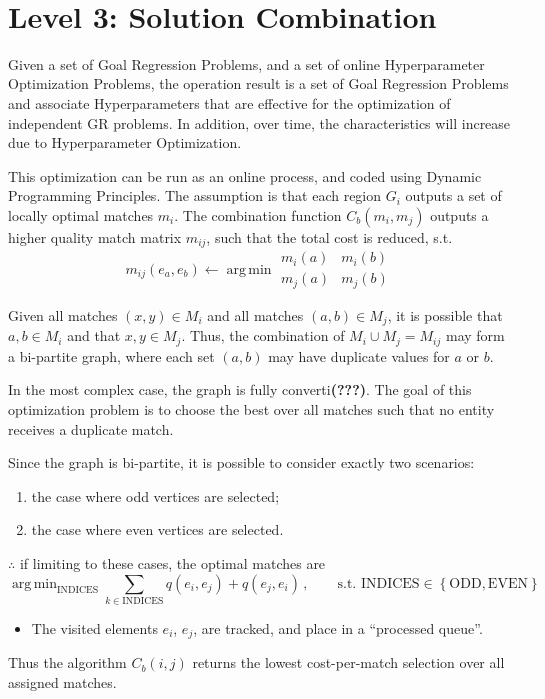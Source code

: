 \documentclass[compsoc,journal,letterpaper,10pt,draftclsnofoot,onecolumn]{IEEEtran}
\DeclareMathOperator*{\argmin}{arg\,min}
\begin{document}
{\ }\\



\section*{Level 3: Solution Combination}

Given a set of Goal Regression Problems, and a set of online Hyperparameter Optimization Problems, the operation result is a set of Goal Regression Problems and associate Hyperparameters that are effective for the optimization of independent GR problems. In addition, over time, the characteristics will increase due to Hyperparameter Optimization.

This optimization can be run as an online process, and coded using Dynamic Programming Principles. The assumption is that each region $G_i$ outputs a set of locally optimal matches $m_i$. The combination function $C_b(m_i,m_j)$ outputs a higher quality match matrix $m_{ij}$, such that the total cost is reduced, s.t.\
\begin{equation}
  m_{ij}(e_a,e_b)\leftarrow \argmin \begin{array}{cc} m_i(a) & m_i(b) \\ m_j(a) & m_j(b) \end{array}
  \end{equation}

Given all matches $(x,y)\in M_i$ and all matches $(a,b)\in M_j$, it is possible that $a,b \in M_i$ and that $x,y \in M_j$. Thus, the combination of $M_i \cup M_j = M_{ij}$ may form a bi-partite graph, where each set $(a,b)$ may have duplicate values for $a$ or $b$.

In the most complex case, the graph is fully converti\textbf{(???)}. The goal of this optimization problem is to choose the best over all matches such that no entity receives a duplicate match.

Since the graph is bi-partite, it is possible to consider exactly two scenarios:
\begin{enumerate}[label=\alph*)]
\item the case where odd vertices are selected;
  \item the case where even vertices are selected.
\end{enumerate}
$\therefore$ if limiting to these cases, the optimal matches are
\begin{equation}
  \argmin_{\text{INDICES}}\sum_{k\in\text{INDICES}}q(e_i,e_j)+q(e_j,e_i)\,,\qquad\text{s.t.\ INDICES}\in\left\{\text{ODD},\text{EVEN}\right\}
  \end{equation}
\begin{itemize}
  \item The visited elements $e_i$, $e_j$, are tracked, and place in a ``processed queue''.
\end{itemize}
Thus the algorithm $C_b(i,j)$ returns the lowest cost-per-match selection over all assigned matches.
\end{document}
